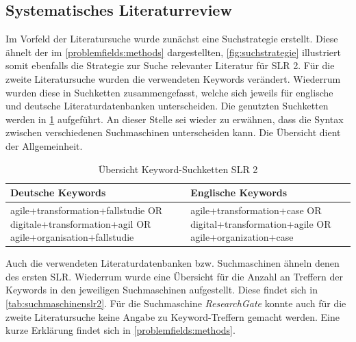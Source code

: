 \subsection{Systematisches Literaturreview}

Im Vorfeld der Literatursuche wurde zunächst eine Suchstrategie erstellt. Diese ähnelt der im \ref{problemfields:methods} dargestellten, \ref{fig:suchstrategie} illustriert somit ebenfalls die Strategie zur Suche relevanter Literatur für SLR 2. Für die zweite Literatursuche wurden die verwendeten Keywords verändert. Wiederrum wurden diese in Suchketten zusammengefasst, welche sich jeweils für englische und deutsche Literaturdatenbanken unterscheiden. Die genutzten Suchketten werden in \ref{tab:keywordsslr2} aufgeführt. An dieser Stelle sei wieder zu erwähnen, dass die Syntax zwischen verschiedenen Suchmaschinen unterscheiden kann. Die Übersicht dient der Allgemeinheit.

\begin{table}[ht]
	\centering
	\caption{Übersicht Keyword-Suchketten SLR 2}
	\begin{tabular}{|p{7cm}|p{7cm}|}
		\hline
		\textbf{Deutsche Keywords}& \textbf{Englische Keywords} \\
		\hline
		agile+transformation+fallstudie OR digitale+transformation+agil OR agile+organisation+fallstudie   & agile+transformation+case OR digital+transformation+agile OR agile+organization+case \\
		\hline
	\end{tabular}
	\label{tab:keywordsslr2}
\end{table}

Auch die verwendeten Literaturdatenbanken bzw. Suchmaschinen ähneln denen des ersten SLR. Wiederrum wurde eine Übersicht für die Anzahl an Treffern der Keywords in den jeweiligen Suchmaschinen aufgestellt. Diese findet sich in \ref{tab:suchmaschinenslr2}. Für die Suchmaschine \textit{ResearchGate} konnte auch für die zweite Literatursuche keine Angabe zu Keyword-Treffern gemacht werden. Eine kurze Erklärung findet sich in \ref{problemfields:methods}.

